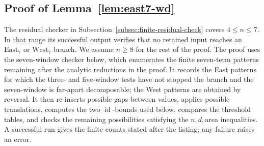 \documentclass[11pt]{article}
\theoremstyle{plain}
\theoremstyle{definition}
\theoremstyle{remark}
\newcommand{\area}{\mathrm{area}}
\begin{document}
\subsection{Proof of Lemma~\ref{lem:east7-wd}}
\label{subsec:proof-east7-wd}
The residual checker in Subsection~\ref{subsec:finite-residual-check} covers
\(4\le n\le 7\).  In that range its successful output verifies that no retained
input reaches an \(\mathrm{East}_7\) or \(\mathrm{West}_7\) branch.  We assume
\(n\ge 8\) for the rest of the proof.
The proof uses the seven-window checker below, which enumerates the finite
seven-term patterns remaining after the analytic reductions in the proof.  It
records the East patterns for which the three- and five-window tests have not
stopped the branch and the seven-window is far-apart decomposable; the West
patterns are obtained by reversal.  It then re-inserts possible gaps between
values, applies possible translations, computes the two
\(\operatorname{id}\)-bounds used below, compares the threshold tables, and
checks the remaining possibilities satisfying the \(n,d,\area\) inequalities.
A successful run gives the finite counts stated after the listing; any failure
raises an error.
\end{document}
